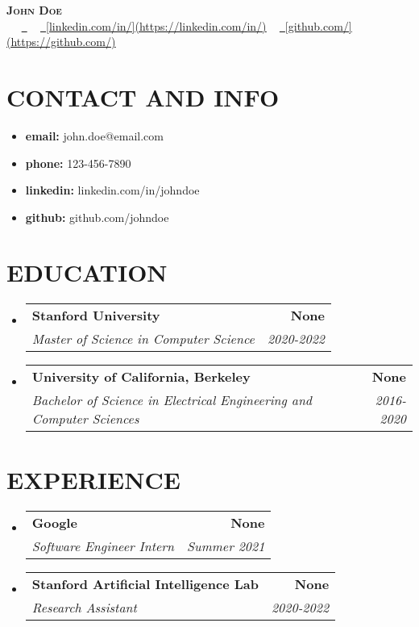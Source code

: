 \documentclass[letterpaper,11pt]{article}
\makeatletter
\newcommand{\resumeItem}[1]{\item\small{{#1 \vspace{-3pt}}}}
\newcommand{\resumeSubheading}[4]{\vspace{-2pt}\item\begin{tabular*}{0.97\textwidth}[t]{l@{\extracolsep{\fill}}r}\textbf{#1} & #2 \\\textit{\small#3} & \textit{\small #4} \\\end{tabular*}\vspace{-7pt}}
\newcommand{\resumeSubHeadingListStart}{\begin{itemize}[leftmargin=0.15in, label={}]}
\newcommand{\resumeSubHeadingListEnd}{\end{itemize}}
\makeatother
\begin{document}
\begin{center}
    \textbf{\Huge \scshape {\fontsize{15pt}{20pt}\selectfont John Doe}} \\ \vspace{1pt}
    \small \raisebox{-0.1\height}\faPhone\  ~ \href{mailto:}{\raisebox{-0.2\height}\faEnvelope\  \underline{}} ~ 
    \href{}{\raisebox{-0.2\height}\faLinkedin\ \underline{[linkedin.com/in/](https://linkedin.com/in/)}} ~ 
    \href{}{\raisebox{-0.2\height}\faGithub\ \underline{[github.com/](https://github.com/)}}
    \vspace{-8pt}
\end{center}

\section{{\fontsize{9pt}{20pt}\selectfont \textbf{CONTACT AND INFO}}}
\resumeSubHeadingListStart
\resumeItem{\textbf{email:} john.doe@email.com}\vspace{-7pt}
\resumeItem{\textbf{phone:} 123-456-7890}\vspace{-7pt}
\resumeItem{\textbf{linkedin:} linkedin.com/in/johndoe}\vspace{-7pt}
\resumeItem{\textbf{github:} github.com/johndoe}
\resumeSubHeadingListEnd\vspace{-15pt}
\section{{\fontsize{9pt}{20pt}\selectfont \textbf{EDUCATION}}}
\resumeSubHeadingListStart
\resumeSubheading{Stanford University}{\textbf{None}}{Master of Science in Computer Science}{2020-2022}

\resumeSubheading{University of California, Berkeley}{\textbf{None}}{Bachelor of Science in Electrical Engineering and Computer Sciences}{2016-2020}

\resumeSubHeadingListEnd\vspace{-15pt}
\section{{\fontsize{9pt}{20pt}\selectfont \textbf{EXPERIENCE}}}
\resumeSubHeadingListStart
\resumeSubheading{Google}{\textbf{None}}{Software Engineer Intern}{Summer 2021}

\resumeSubheading{Stanford Artificial Intelligence Lab}{\textbf{None}}{Research Assistant}{2020-2022}

\resumeSubHeadingListEnd\vspace{-15pt}
\end{document}
